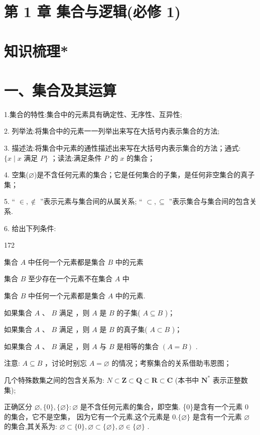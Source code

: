 \section*{第 1 章 集合与逻辑(必修 1)}

\section*{知识梳理*}

\section*{一、集合及其运算}

1.集合的特性:集合中的元素具有确定性、无序性、互异性;

2. 列举法:将集合中的元素一一列举出来写在大括号内表示集合的方法;

3. 描述法:将集合中元素的通性描述出来写在大括号内表示集合的方法；通式: $\{ x \mid  x$ 满足 $P\}$ ；读法:满足条件 $P$ 的 $x$ 的集合；

4. 空集($\varnothing$)是不含任何元素的集合；它是任何集合的子集，是任何非空集合的真子集；

5. “ $\in  , \notin$ ”表示元素与集合间的从属关系; “ $\subset  , \subseteq$ ”表示集合与集合间的包含关系.

6. 给出下列条件:
\begin{dingautolist}{172}
    \item 集合 $A$ 中任何一个元素都是集合 $B$ 中的元素
    \item 集合 $B$ 至少存在一个元素不在集合 $A$ 中
    \item 集合 $B$ 中任何一个元素都是集合 $A$ 中的元素.
\end{dingautolist}
如果集合 $A$ 、 $B$ 满足  ，则 $A$ 是 $B$ 的子集( $A \subseteq  B$ )；

如果集合 $A$ 、 $B$ 满足    ，则 $A$ 是 $B$ 的真子集( $A \subset  B$ )；

如果集合 $A$ 、 $B$ 满足    ，则 $A$ 与 $B$ 是相等的集合 $\left( {A = B}\right)$ .

注意:   $A \subseteq  B$ ，讨论时别忘 $A = \varnothing$ 的情况；考察集合的关系借助韦恩图；

  几个特殊数集之间的包含关系为: ${N} \subset  \mathbf{Z} \subset  \mathbf{Q} \subset  \mathbf{R} \subset  \mathbf{C}$ (本书中 ${\mathbf{N}}^{ * }$ 表示正整数集);

  正确区分 $\varnothing ,\{ 0\} ,\{ \varnothing \}  : \varnothing$ 是不含任何元素的集合，即空集. \{0\}是含有一个元素 0 的集合，它不是空集， 因为它有一个元素,这个元素是 $0.\{ \varnothing \}$ 是含有一个元素 $\varnothing$ 的集合,其关系为: $\varnothing  \subset  \{ 0\} ,\varnothing  \subset  \{ \varnothing \} ,\varnothing  \in  \{ \varnothing \}$ .

